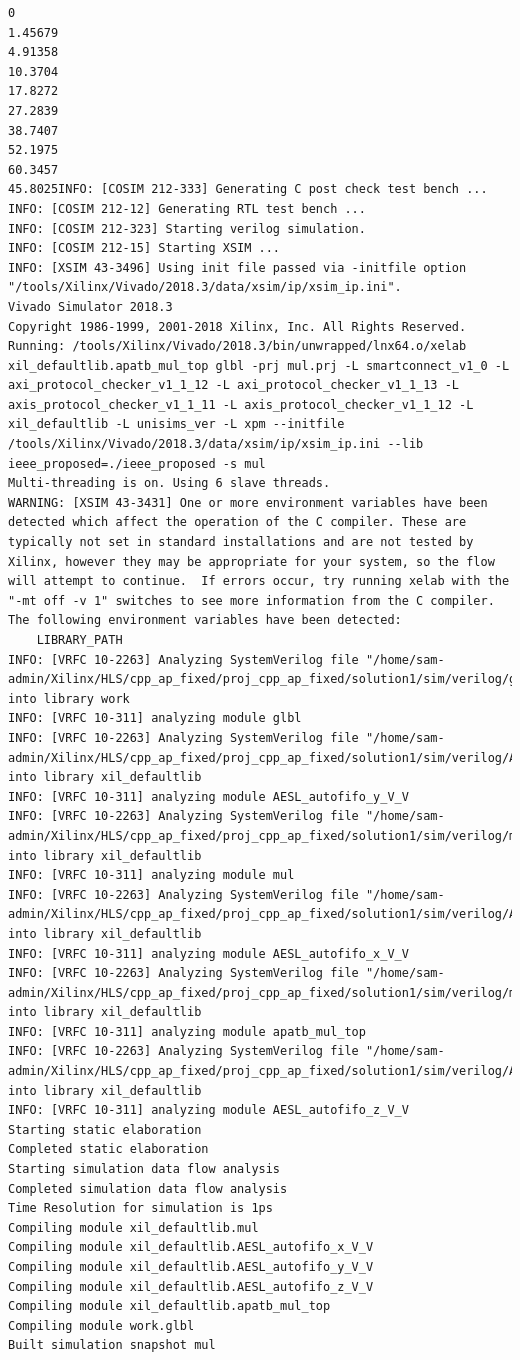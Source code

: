 \documentclass{article}
\begin{document}
\begin{lstlisting}
0
1.45679
4.91358
10.3704
17.8272
27.2839
38.7407
52.1975
60.3457
45.8025INFO: [COSIM 212-333] Generating C post check test bench ...
INFO: [COSIM 212-12] Generating RTL test bench ...
INFO: [COSIM 212-323] Starting verilog simulation. 
INFO: [COSIM 212-15] Starting XSIM ...
INFO: [XSIM 43-3496] Using init file passed via -initfile option "/tools/Xilinx/Vivado/2018.3/data/xsim/ip/xsim_ip.ini".
Vivado Simulator 2018.3
Copyright 1986-1999, 2001-2018 Xilinx, Inc. All Rights Reserved.
Running: /tools/Xilinx/Vivado/2018.3/bin/unwrapped/lnx64.o/xelab xil_defaultlib.apatb_mul_top glbl -prj mul.prj -L smartconnect_v1_0 -L axi_protocol_checker_v1_1_12 -L axi_protocol_checker_v1_1_13 -L axis_protocol_checker_v1_1_11 -L axis_protocol_checker_v1_1_12 -L xil_defaultlib -L unisims_ver -L xpm --initfile /tools/Xilinx/Vivado/2018.3/data/xsim/ip/xsim_ip.ini --lib ieee_proposed=./ieee_proposed -s mul 
Multi-threading is on. Using 6 slave threads.
WARNING: [XSIM 43-3431] One or more environment variables have been detected which affect the operation of the C compiler. These are typically not set in standard installations and are not tested by Xilinx, however they may be appropriate for your system, so the flow will attempt to continue.  If errors occur, try running xelab with the "-mt off -v 1" switches to see more information from the C compiler. The following environment variables have been detected:
    LIBRARY_PATH
INFO: [VRFC 10-2263] Analyzing SystemVerilog file "/home/sam-admin/Xilinx/HLS/cpp_ap_fixed/proj_cpp_ap_fixed/solution1/sim/verilog/glbl.v" into library work
INFO: [VRFC 10-311] analyzing module glbl
INFO: [VRFC 10-2263] Analyzing SystemVerilog file "/home/sam-admin/Xilinx/HLS/cpp_ap_fixed/proj_cpp_ap_fixed/solution1/sim/verilog/AESL_autofifo_y_V_V.v" into library xil_defaultlib
INFO: [VRFC 10-311] analyzing module AESL_autofifo_y_V_V
INFO: [VRFC 10-2263] Analyzing SystemVerilog file "/home/sam-admin/Xilinx/HLS/cpp_ap_fixed/proj_cpp_ap_fixed/solution1/sim/verilog/mul.v" into library xil_defaultlib
INFO: [VRFC 10-311] analyzing module mul
INFO: [VRFC 10-2263] Analyzing SystemVerilog file "/home/sam-admin/Xilinx/HLS/cpp_ap_fixed/proj_cpp_ap_fixed/solution1/sim/verilog/AESL_autofifo_x_V_V.v" into library xil_defaultlib
INFO: [VRFC 10-311] analyzing module AESL_autofifo_x_V_V
INFO: [VRFC 10-2263] Analyzing SystemVerilog file "/home/sam-admin/Xilinx/HLS/cpp_ap_fixed/proj_cpp_ap_fixed/solution1/sim/verilog/mul.autotb.v" into library xil_defaultlib
INFO: [VRFC 10-311] analyzing module apatb_mul_top
INFO: [VRFC 10-2263] Analyzing SystemVerilog file "/home/sam-admin/Xilinx/HLS/cpp_ap_fixed/proj_cpp_ap_fixed/solution1/sim/verilog/AESL_autofifo_z_V_V.v" into library xil_defaultlib
INFO: [VRFC 10-311] analyzing module AESL_autofifo_z_V_V
Starting static elaboration
Completed static elaboration
Starting simulation data flow analysis
Completed simulation data flow analysis
Time Resolution for simulation is 1ps
Compiling module xil_defaultlib.mul
Compiling module xil_defaultlib.AESL_autofifo_x_V_V
Compiling module xil_defaultlib.AESL_autofifo_y_V_V
Compiling module xil_defaultlib.AESL_autofifo_z_V_V
Compiling module xil_defaultlib.apatb_mul_top
Compiling module work.glbl
Built simulation snapshot mul



\end{lstlisting}
\end{document}
